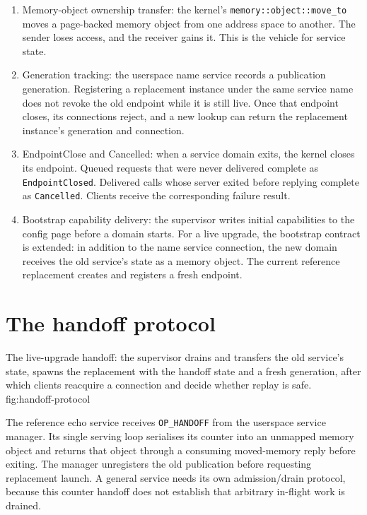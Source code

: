 \begin{enumerate}
    \item Memory-object ownership transfer: the kernel's
        \texttt{memory::object::move\_to} moves a page-backed memory object
        from one address space to another. The sender loses access, and the
        receiver gains it. This is the vehicle for service state.

    \item Generation tracking: the userspace name service records a
        publication generation. Registering a replacement instance under the same
        service name does not revoke the old endpoint while it is still live.
        Once that endpoint closes, its connections reject, and a new lookup can
        return the replacement instance's generation and connection.

    \item EndpointClose and Cancelled: when a service domain exits,
        the kernel closes its endpoint. Queued requests that were never
        delivered complete as \texttt{EndpointClosed}. Delivered calls whose
        server exited before replying complete as \texttt{Cancelled}. Clients
        receive the corresponding failure result.

    \item Bootstrap capability delivery: the supervisor writes
        initial capabilities to the config page before a domain starts. For a
        live upgrade, the bootstrap contract is extended: in addition to the
        name service connection, the new domain receives the old service's
        state as a memory object. The current reference replacement creates and
        registers a fresh endpoint.
\end{enumerate}

\section{The handoff protocol}

    {The live-upgrade handoff: the supervisor drains and transfers the old
    service's state, spawns the replacement with the handoff state and a fresh
    generation, after which clients reacquire a connection and decide whether replay is safe.}
    {fig:handoff-protocol}

The reference echo service receives \texttt{OP\_HANDOFF} from the userspace
service manager. Its single serving loop serialises its counter into an unmapped
memory object and returns that object through a consuming moved-memory reply
before exiting. The manager unregisters the old publication before requesting
replacement launch. A general service needs its own admission/drain protocol, because
this counter handoff does not establish that arbitrary in-flight work is drained.

